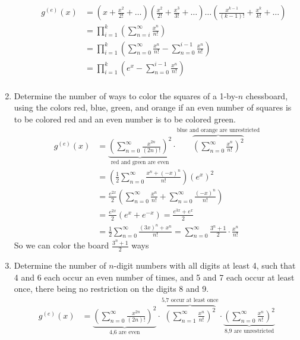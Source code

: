 \documentclass{article}
\begin{document}
\begin{enumerate}
\begin{enumerate}
\begin{align*}
  g^{(e)}(x)&=\left(x+\frac{x^2}{2!}+\dots\right)\left(\frac{x^2}{2!}+\frac{x^3}{3!}+\dots\right)\dots\left(\frac{x^{k-1}}{(k-1)!}+\frac{x^k}{k!}+\dots\right)\\
  &=\prod_{i=1}^k{\left(\sum\limits_{n=i}^\infty{\frac{x^n}{n!}}\right)}\\
  &=\prod_{i=1}^k{\left(\sum\limits_{n=0}^\infty{\frac{x^n}{n!}}-\sum\limits_{n=0}^{i-1}{\frac{x^n}{n!}}\right)}\\
  &=\prod_{i=1}^k{\left(e^x-\sum\limits_{n=0}^{i-1}{\frac{x^n}{n!}}\right)}\\
\end{align*}
\end{enumerate}
\setcounter{enumi}{25}
\item
Determine the number of ways to color the squares of a 1-by-$n$ chessboard, using the colors red, blue, green, and orange if an even number of squares is to be colored red and an even number is to be colored green.
\begin{align*}
  g^{(e)}(x)&=\underbrace{\left(\sum\limits_{n=0}^\infty{\frac{x^{2n}}{(2n)!}}\right)^2}_{\text{red and green are even}}\cdot\overbrace{\left(\sum\limits_{n=0}^\infty{\frac{x^{n}}{n!}}\right)^2}^{\text{blue and orange are unrestricted}}\\
  &=\left(\frac{1}{2}\sum\limits_{n=0}^\infty{\frac{x^n+(-x)^n}{n!}}\right)\left(e^x\right)^2\\
  &=\frac{e^{2x}}{2}\left(\sum\limits_{n=0}^\infty{\frac{x^n}{n!}}+\sum\limits_{n=0}^\infty{\frac{(-x)^n}{n!}}\right)\\
  &=\frac{e^{2x}}{2}\left(e^x+e^{-x}\right)=\frac{e^{3x}+e^x}{2}\\
  &=\frac{1}{2}\sum\limits_{n=0}^\infty{\frac{(3x)^n+x^n}{n!}}=\sum\limits_{n=0}^\infty{\frac{3^n+1}{2}\cdot\frac{x^n}{n!}}
\end{align*}
So we can color the board $\frac{3^n+1}{2}$ ways
\setcounter{enumi}{27}
\item
Determine the number of $n$-digit numbers with all digits at least 4, such that 4 and 6 each occur an even number of times, and 5 and 7 each occur at least once, there being no restriction on the digits 8 and 9.
\begin{align*}
  g^{(e)}(x)&=\underbrace{\left(\sum\limits_{n=0}^\infty{\frac{x^{2n}}{(2n)!}}\right)^2}_{\text{4,6 are even}}\cdot\overbrace{\left(\sum\limits_{n=1}^\infty{\frac{x^n}{n!}}\right)^2}^{\text{5,7 occur at least once}}\cdot\underbrace{\left(\sum\limits_{n=0}^\infty{\frac{x^n}{n!}}\right)^2}_{\text{8,9 are unrestricted}}\\

\end{align*}
\end{enumerate}
\end{document}
